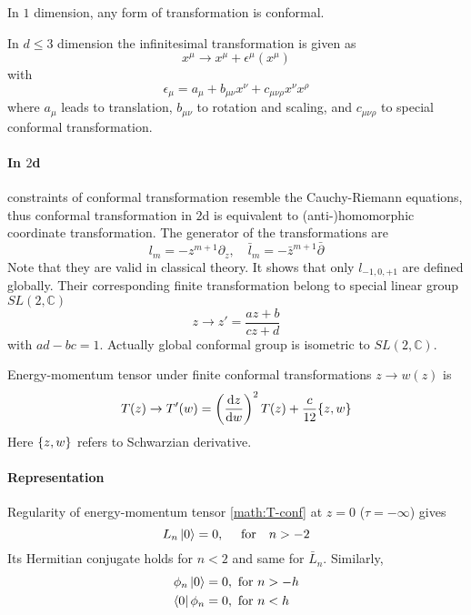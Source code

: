 \documentclass[12pt, a4paper, DIV=15]{article}
\numberwithin{equation}{section}
\begin{document}
In $1$ dimension, any form of transformation is conformal.

In $d\leq 3$ dimension the infinitesimal transformation is given as
\begin{equation}
	x^\mu \rightarrow x^\mu + \epsilon^\mu(x^\mu)
\end{equation}
with
\begin{equation}
	\epsilon_\mu = a_\mu + b_{\mu\nu}x^\nu + c_{\mu\nu\rho}x^\nu x^\rho	
\end{equation}
where $a_\mu$ leads to translation, $b_{\mu\nu}$ to rotation and scaling, and $c_{\mu\nu\rho}$ to special conformal transformation.

\paragraph{In $2$d}
constraints of conformal transformation resemble the Cauchy-Riemann equations, thus conformal transformation in $2$d is equivalent to (anti-)homomorphic coordinate transformation. The generator of the transformations are
\begin{equation}
	l_m = - z^{m+1} \partial_z, \quad \bar{l}_m = - \bar{z}^{m+1}\bar{\partial}
\end{equation}
Note that they are valid in classical theory. It shows that only $l_{-1,0,+1}$ are defined globally. Their corresponding finite transformation belong to special linear group $SL(2,\mathbb{C})$
\begin{equation}
	z \rightarrow z'= \frac{az + b}{cz + d}
\end{equation}
with $ad-bc=1$. Actually global conformal group is isometric to $SL(2,\mathbb{C})$.

Energy-momentum tensor under finite conformal transformations $z \rightarrow w(z)$ is 
\begin{equation}
	T(z) \rightarrow T'(w) = \left( \dv{z}{w} \right)^2 T(z) + \frac{c}{12} \acomm{z}{w}
\end{equation}
Here $\acomm{z}{w}$ refers to Schwarzian derivative.

\paragraph{Representation}
Regularity of energy-momentum tensor \eqref{math:T-conf} at $z=0$ ($\tau=-\infty$) gives
\begin{equation}
	L_n \ket{0} = 0, \quad \text{ for} \quad n > -2
\end{equation}
Its Hermitian conjugate holds for $n<2$ and same for $\bar{L}_n$. Similarly,
\begin{subequations}
\begin{align}
	\phi_n \ket{0} &= 0, \text{ for } n > -h \\
	\bra{0} \phi_n &= 0, \text{ for } n < h
\end{align}
\end{subequations}
\end{document}
